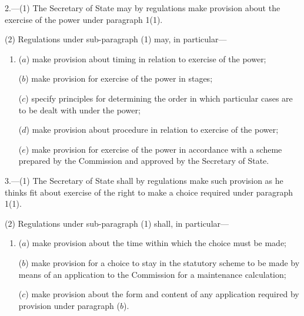 \documentclass[12pt,a4paper]{article}
\begin{document}
%
%
%
%
%
%


\medskip

2.---(1) The Secretary of State may by regulations make provision about the exercise of the power under paragraph 1(1).

(2) Regulations under sub-paragraph (1) may, in particular—
\begin{enumerate}\item[]
($a$) make provision about timing in relation to exercise of the power;

($b$) make provision for exercise of the power in stages;

($c$) specify principles for determining the order in which particular cases are to be dealt with under the power;

($d$) make provision about procedure in relation to exercise of the power;

($e$) make provision for exercise of the power in accordance with a scheme prepared by the Commission and approved by the Secretary of State.
\end{enumerate}


\medskip

3.---(1) The Secretary of State shall by regulations make such provision as he thinks fit about exercise of the right to make a choice required under paragraph 1(1).

(2) Regulations under sub-paragraph (1) shall, in particular—
\begin{enumerate}\item[]
($a$) make provision about the time within which the choice must be made;

($b$) make provision for a choice to stay in the statutory scheme to be made by means of an application to the Commission for a maintenance calculation;

($c$) make provision about the form and content of any application required by provision under paragraph ($b$).
\end{enumerate}
\end{document}
